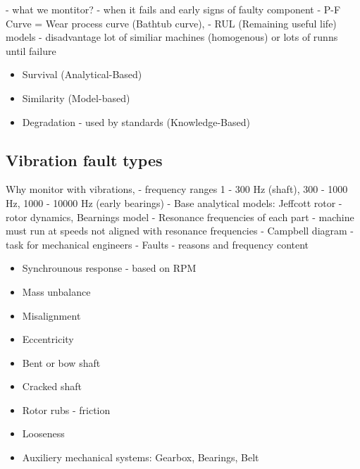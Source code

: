- what we montitor? - when it fails and early signs of faulty component
- P-F Curve  = Wear process curve (Bathtub curve), 
- RUL (Remaining useful life) models - disadvantage lot of similiar machines (homogenous) or lots of runns until failure
\cite{okoh_overview_2014}
\begin{itemize}
\item Survival (Analytical-Based)
\item Similarity (Model-based)
\item Degradation - used by standards (Knowledge-Based)
\end{itemize}

\subsection{Vibration fault types}
Why monitor with vibrations,
- frequency ranges 1 - 300 Hz (shaft), 300 - 1000 Hz, 1000 - 10000 Hz (early bearings)
- Base analytical models: Jeffcott rotor - rotor dynamics, Bearnings model
- Resonance frequencies of each part - machine must run at speeds not aligned with resonance frequencies - Campbell diagram - task for mechanical engineers
- Faults - reasons and frequency content
\cite{torres_automatic_2022}
\cite{noauthor_vibration_2000}
\cite{cakir_experimental_2021}
\cite{ziaran_technicka_2013}

\begin{itemize}
\item Synchrounous response - based on RPM
\item Mass unbalance
\item Misalignment
\item Eccentricity
\item Bent or bow shaft
\item Cracked shaft
\item Rotor rubs - friction
\item Looseness
\item Auxiliery mechanical systems: Gearbox, Bearings, Belt 
\end{itemize}

\cite{lengoc_vibration_1990}
\cite{chen_study_2014}


